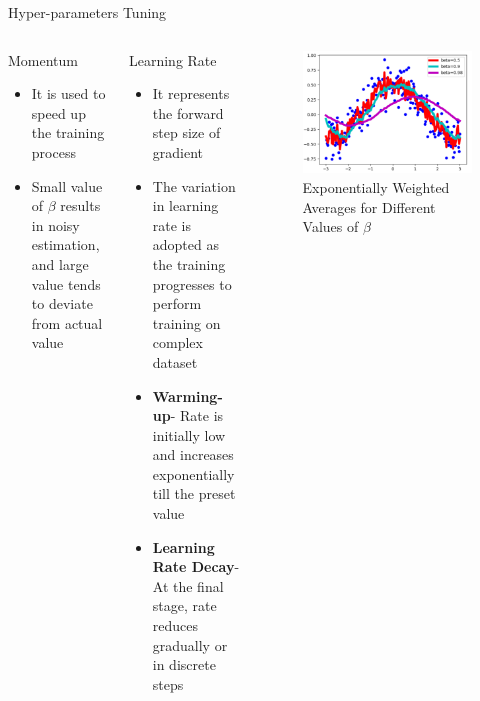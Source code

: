 \documentclass[10pt]{beamer}
\begin{document}
\begin{frame}{Hyper-parameters Tuning}
\begin{columns}
    \begin{block}{Momentum}
         \begin{itemize}
             \item It is used to speed up the training process
             \item Small value of $\beta$ results in noisy estimation, and large value tends to deviate from actual value
         \end{itemize}
    \end{block}
    
    \begin{block}{Learning Rate}
         \begin{itemize}
             \item It represents the forward step size of gradient 
             \item The variation in learning rate is adopted as the training progresses to perform training on complex dataset
             \item \textbf{Warming-up}- Rate is initially low and increases exponentially till the preset value 
             \item \textbf{Learning Rate Decay}- At the final stage, rate reduces gradually or in discrete steps  
         \end{itemize}
    \end{block}   
    
    \begin{figure}
         \centering
         \includegraphics[width=1\textwidth]{Images/momentumpara.png}
         \caption{Exponentially Weighted Averages for Different Values of $\beta$}
    \end{figure}
\end{columns} 
\end{frame}
\end{document}
